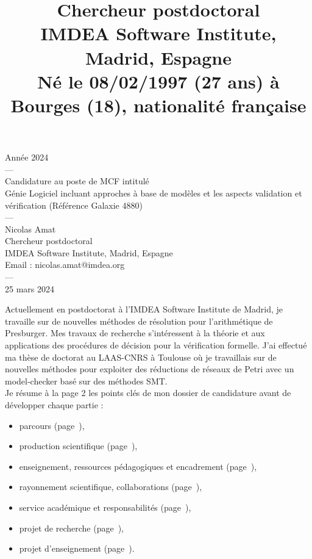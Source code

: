 \documentclass[11pt,a4paper]{moderncv}
\title{\normalsize  Chercheur postdoctoral\\
IMDEA Software Institute, Madrid, Espagne\\
Né le 08/02/1997 (27 ans) à Bourges (18), nationalité française\\
}
\begin{document}
\thispagestyle{empty}

\begin{center}
{\small Année 2024\\---\\
\huge Candidature au poste de MCF intitulé \\\og Génie Logiciel incluant approches à base de modèles et les aspects validation et vérification\fg\medbreak
\Large(Référence Galaxie 4880)\\
\small
---\\
\Large Nicolas Amat \\
\vspace{1em}
\small Chercheur postdoctoral\\
IMDEA Software Institute, Madrid, Espagne\\
    Email : nicolas.amat@imdea.org\\
---\\
25 mars 2024}
\end{center}

\newpage

\setcounter{page}{1}
\newpage

\makecvtitle

Actuellement en postdoctorat à l'IMDEA Software Institute de Madrid, je
travaille sur de nouvelles méthodes de résolution pour l'arithmétique de
Presburger. Mes travaux de recherche s'intéressent à la théorie et aux
applications des procédures de décision pour la vérification formelle. J'ai
effectué ma thèse de doctorat au LAAS-CNRS à Toulouse où je travaillais sur de
nouvelles méthodes pour exploiter des réductions de réseaux de Petri avec un
model-checker basé sur des méthodes SMT.\\

Je résume à la page 2 les points clés de mon dossier de candidature avant de
développer chaque partie :
\begin{itemize}
    \item parcours (page~\pageref{sec:formation}),
    \item production scientifique (page~\pageref{sec:recherche}), 
    \item enseignement, ressources pédagogiques et encadrement (page~\pageref{sec:enseignements}),
    \item rayonnement scientifique, collaborations (page~\pageref{sec:rayonnement}),
    \item service académique et responsabilités (page~\pageref{sec:resp}),
    \item projet de recherche (page~\pageref{sec:projet_recherche}),
    \item projet d'enseignement (page~\pageref{sec:projet_enseignement}).\\
\end{itemize}
\end{document}

